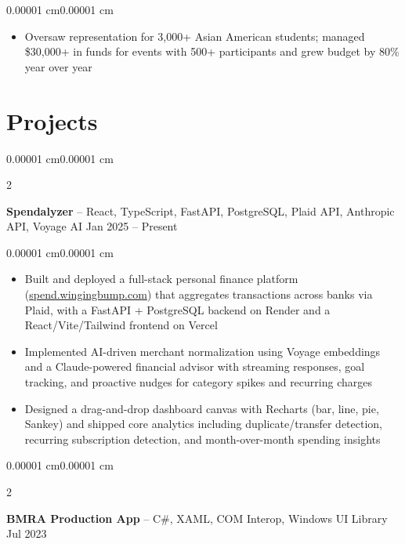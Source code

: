 \documentclass[10pt, letterpaper]{article}
\newenvironment{highlights}{
    \begin{itemize}[
        topsep=0.05 cm,
        parsep=0.05 cm,
        partopsep=0pt,
        itemsep=0pt,
        leftmargin=10pt
    ]
}{
    \end{itemize}
}
\newenvironment{onecolentry}{
    \begin{adjustwidth}{0.00001 cm}{0.00001 cm}
}{
    \end{adjustwidth}
}
\newenvironment{twocolentry}[2][]{
    \onecolentry
    \def\secondColumn{#2}
    \setcolumnwidth{\fill, 4.5 cm}
    \begin{paracol}{2}
}{
    \switchcolumn \raggedleft \secondColumn
    \end{paracol}
    \endonecolentry
}
\begin{document}
        \vspace{0.05 cm}
        \begin{onecolentry}
            \begin{highlights}
                \item Oversaw representation for 3,000+ Asian American students; managed \$30,000+ in funds for events with 500+ participants and grew budget by 80\% year over year
            \end{highlights}
        \end{onecolentry}


    \section{Projects}

        \begin{twocolentry}{
            Jan 2025 -- Present
        }
            \textbf{Spendalyzer} -- React, TypeScript, FastAPI, PostgreSQL, Plaid API, Anthropic API, Voyage AI\end{twocolentry}

        \vspace{0.05 cm}
        \begin{onecolentry}
            \begin{highlights}
                \item Built and deployed a full-stack personal finance platform (\href{https://spend.wingingbump.com}{spend.wingingbump.com}) that aggregates transactions across banks via Plaid, with a FastAPI + PostgreSQL backend on Render and a React/Vite/Tailwind frontend on Vercel
                \item Implemented AI-driven merchant normalization using Voyage embeddings and a Claude-powered financial advisor with streaming responses, goal tracking, and proactive nudges for category spikes and recurring charges
                \item Designed a drag-and-drop dashboard canvas with Recharts (bar, line, pie, Sankey) and shipped core analytics including duplicate/transfer detection, recurring subscription detection, and month-over-month spending insights
            \end{highlights}
        \end{onecolentry}

        \vspace{0.1 cm}

        \begin{twocolentry}{
            Jul 2023
        }
            \textbf{BMRA Production App} -- C\#, XAML, COM Interop, Windows UI Library\end{twocolentry}
\end{document}
